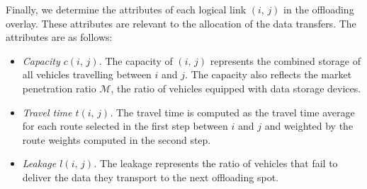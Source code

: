 Finally, we determine the attributes of each logical link $(i,\,j)$ in the offloading overlay. These attributes are relevant to the allocation of the data transfers. The attributes are as follows:
\begin{itemize}

    \item \textit{Capacity $c(i,\,j)$.} The capacity of $(i,\,j)$ represents the combined storage of all vehicles travelling between $i$ and $j$. The capacity also reflects the market penetration ratio $\mathcal{M}$, \ie the ratio of vehicles equipped with data storage devices.
    
    \item \textit{Travel time $t(i,\,j)$.} The travel time is computed as the travel time average for each route selected in the first step  between $i$ and $j$ and weighted by the route weights computed in the second step.
    
    \item \textit{Leakage $l(i,\,j)$.} The leakage represents the ratio of vehicles that fail to deliver the data they transport to the next offloading spot.
    
\end{itemize}




